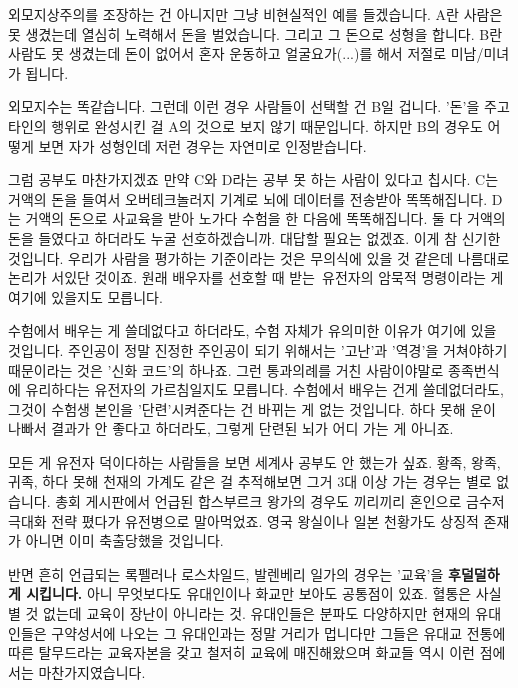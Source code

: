 \vspace{5mm}

외모지상주의를 조장하는 건 아니지만 그냥 비현실적인 예를 들겠습니다.
A란 사람은 못 생겼는데 열심히 노력해서 돈을 벌었습니다. 그리고 그 돈으로 성형을 합니다.
B란 사람도 못 생겼는데 돈이 없어서 혼자 운동하고 얼굴요가(...)를 해서 저절로 미남/미녀가 됩니다.
\vspace{5mm}

외모지수는 똑같습니다. 그런데 이런 경우 사람들이 선택할 건 B일 겁니다.
'돈'을 주고 타인의 행위로 완성시킨 걸 A의 것으로 보지 않기 때문입니다.
하지만 B의 경우도 어떻게 보면 자가 성형인데 저런 경우는 자연미로 인정받습니다.
\vspace{5mm}

그럼 공부도 마찬가지겠죠
만약 C와 D라는 공부 못 하는 사람이 있다고 칩시다.
C는 거액의 돈을 들여서 오버테크놀러지 기계로 뇌에 데이터를 전송받아 똑똑해집니다.
D는 거액의 돈으로 사교육을 받아 노가다 수험을 한 다음에 똑똑해집니다.
둘 다 거액의 돈을 들였다고 하더라도 누굴 선호하겠습니까. 대답할 필요는 없겠죠.
이게 참 신기한 것입니다. 우리가 사람을 평가하는 기준이라는 것은 무의식에 있을 것 같은데 나름대로 논리가 서있단 것이죠.
원래 배우자를 선호할 때 받는 유전자의 암묵적 명령이라는 게 여기에 있을지도 모릅니다.
\vspace{5mm}

수험에서 배우는 게 쓸데없다고 하더라도, 수험 자체가 유의미한 이유가 여기에 있을 것입니다.
주인공이 정말 진정한 주인공이 되기 위해서는 '고난'과 '역경'을 거쳐야하기 때문이라는 것은 '신화 코드'의 하나죠.
그런 통과의례를 거친 사람이야말로 종족번식에 유리하다는 유전자의 가르침일지도 모릅니다.
수험에서 배우는 건게 쓸데없더라도, 그것이 수험생 본인을 '단련'시켜준다는 건 바뀌는 게 없는 것입니다.
하다 못해 운이 나빠서 결과가 안 좋다고 하더라도, 그렇게 단련된 뇌가 어디 가는 게 아니죠.
\vspace{5mm}

모든 게 유전자 덕이다하는 사람들을 보면 세계사 공부도 안 했는가 싶죠.
황족, 왕족, 귀족, 하다 못해 천재의 가계도 같은 걸 추적해보면 그거 3대 이상 가는 경우는 별로 없습니다.
총회 게시판에서 언급된 합스부르크 왕가의 경우도 끼리끼리 혼인으로 금수저 극대화 전략 폈다가 유전병으로 말아먹었죠.
영국 왕실이나 일본 천황가도 상징적 존재가 아니면 이미 축출당했을 것입니다.
\vspace{5mm}

반면 흔히 언급되는 록펠러나 로스차일드, 발렌베리 일가의 경우는 '교육'을 \textbf{후덜덜하게 시킵니다.}
아니 무엇보다도 유대인이나 화교만 보아도 공통점이 있죠. 혈통은 사실 별 것 없는데 교육이 장난이 아니라는 것.
유대인들은 분파도 다양하지만 현재의 유대인들은 구약성서에 나오는 그 유대인과는 정말 거리가 멉니다만
그들은 유대교 전통에 따른 탈무드라는 교육자본을 갖고 철저히 교육에 매진해왔으며
화교들 역시 이런 점에서는 마찬가지였습니다.
\vspace{5mm}

